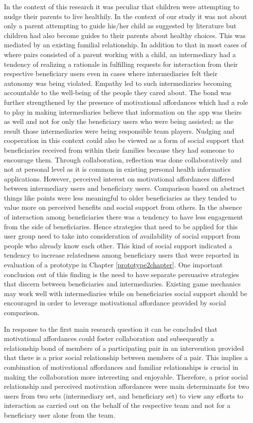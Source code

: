 In the context of this research it was peculiar that children were attempting to nudge their parents to live healthily. In the context of our study it was not about only a parent attempting to guide his/her child as suggested by literature but children had also become guides to their parents about healthy choices. This was mediated by an existing familial relationship. In addition to that in most cases of where pairs consisted of a parent working with a child, an intermediary had a tendency of realizing a rationale in fulfilling  requests for interaction from their respective beneficiary users even in cases where intermediaries felt their autonomy was being violated. Empathy led to such intermediaries becoming accountable to the well-being of the people they cared about. The bond was further strengthened by the presence of motivational affordances which had a role to play in making intermediaries believe that information on the app was theirs as well and not for only the beneficiary users who were being assisted; as the result those intermediaries were being responsible team players. Nudging and cooperation in this context could also be viewed as a form of social support that beneficiaries received from within their families because they had someone to encourage them. Through collaboration, reflection was done collaboratively and not at personal level as it is common in existing personal health informatics applications.  However, perceived interest on motivational affordances differed between intermediary users and beneficiary users. Comparison based on abstract things like points were less meaningful to older beneficiaries as they tended to value more on perceived benefits and social support from others. In the absence of interaction among beneficiaries there was a tendency to have less engagement from the side of beneficiaries. Hence strategies that need to be applied for this user group need to take into consideration of availability of social support from people who already know each other. This kind of social support indicated a tendency to increase relatedness among beneficiary users that were reported in evaluation of a prototype in Chapter \ref{prototype2chapter}. One important conclusion out of this finding is the need to have separate persuasive strategies that discern between beneficiaries and intermediaries. Existing game mechanics may work well with intermediaries while on beneficiaries social support should be encouraged in order to leverage motivational affordance provided by social comparison.

In response to the first main research question it can be concluded that motivational affordances could foster collaboration and subsequently a relationship bond of members of a participating pair in an intervention provided that there is a prior social relationship between members of a pair. This implies a combination of motivational affordances and familiar relationships is crucial in making the collaboration more interesting and enjoyable. Therefore, a prior social relationship and perceived motivation affordances were main determinants for two users from two sets (intermediary set, and beneficiary set) to view any efforts to interaction as carried out on the behalf of the respective team and not for a beneficiary user alone from the team.  

